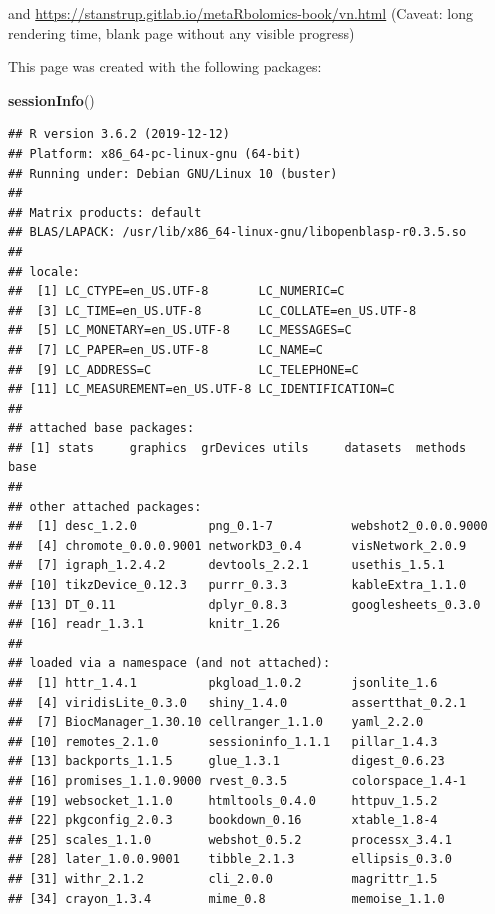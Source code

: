 \documentclass[]{article}
\newenvironment{Shaded}{\begin{snugshade}}{\end{snugshade}}
\newcommand{\KeywordTok}[1]{\textcolor[rgb]{0.13,0.29,0.53}{\textbf{#1}}}
\newcommand{\NormalTok}[1]{#1}
\begin{document}
and \href{vn.html}{https://stanstrup.gitlab.io/metaRbolomics-book/vn.html} (Caveat: long rendering time, blank page without any visible progress)

This page was created with the following packages:

\begin{Shaded}
\begin{Highlighting}[]
\KeywordTok{sessionInfo}\NormalTok{()}
\end{Highlighting}
\end{Shaded}

\begin{verbatim}
## R version 3.6.2 (2019-12-12)
## Platform: x86_64-pc-linux-gnu (64-bit)
## Running under: Debian GNU/Linux 10 (buster)
## 
## Matrix products: default
## BLAS/LAPACK: /usr/lib/x86_64-linux-gnu/libopenblasp-r0.3.5.so
## 
## locale:
##  [1] LC_CTYPE=en_US.UTF-8       LC_NUMERIC=C              
##  [3] LC_TIME=en_US.UTF-8        LC_COLLATE=en_US.UTF-8    
##  [5] LC_MONETARY=en_US.UTF-8    LC_MESSAGES=C             
##  [7] LC_PAPER=en_US.UTF-8       LC_NAME=C                 
##  [9] LC_ADDRESS=C               LC_TELEPHONE=C            
## [11] LC_MEASUREMENT=en_US.UTF-8 LC_IDENTIFICATION=C       
## 
## attached base packages:
## [1] stats     graphics  grDevices utils     datasets  methods   base     
## 
## other attached packages:
##  [1] desc_1.2.0          png_0.1-7           webshot2_0.0.0.9000
##  [4] chromote_0.0.0.9001 networkD3_0.4       visNetwork_2.0.9   
##  [7] igraph_1.2.4.2      devtools_2.2.1      usethis_1.5.1      
## [10] tikzDevice_0.12.3   purrr_0.3.3         kableExtra_1.1.0   
## [13] DT_0.11             dplyr_0.8.3         googlesheets_0.3.0 
## [16] readr_1.3.1         knitr_1.26         
## 
## loaded via a namespace (and not attached):
##  [1] httr_1.4.1          pkgload_1.0.2       jsonlite_1.6       
##  [4] viridisLite_0.3.0   shiny_1.4.0         assertthat_0.2.1   
##  [7] BiocManager_1.30.10 cellranger_1.1.0    yaml_2.2.0         
## [10] remotes_2.1.0       sessioninfo_1.1.1   pillar_1.4.3       
## [13] backports_1.1.5     glue_1.3.1          digest_0.6.23      
## [16] promises_1.1.0.9000 rvest_0.3.5         colorspace_1.4-1   
## [19] websocket_1.1.0     htmltools_0.4.0     httpuv_1.5.2       
## [22] pkgconfig_2.0.3     bookdown_0.16       xtable_1.8-4       
## [25] scales_1.1.0        webshot_0.5.2       processx_3.4.1     
## [28] later_1.0.0.9001    tibble_2.1.3        ellipsis_0.3.0     
## [31] withr_2.1.2         cli_2.0.0           magrittr_1.5       
## [34] crayon_1.3.4        mime_0.8            memoise_1.1.0      

\end{verbatim}
\end{document}
